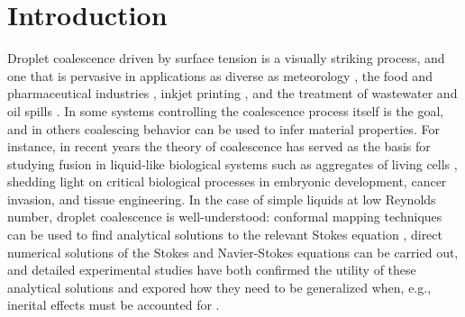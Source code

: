 \documentclass[%
reprint,
amsmath,amssymb,
aps,
]{revtex4-2}
\begin{document}
	\maketitle
	
	
	\section{Introduction}
	Droplet coalescence driven by surface tension is a visually striking process, and one that is pervasive in applications as diverse as  meteorology \cite{grabowski2013growth}, the food \cite{tan2021application} and pharmaceutical industries \cite{barkat2011basics},  inkjet printing \cite{sun2015recent}, and the treatment of wastewater \cite{hussein2019application} and oil spills \cite{zhu2022recent}. In some systems controlling the coalescence process itself is the goal, and in others coalescing behavior can be used to infer material properties. For instance, in recent years the theory of coalescence has served as the basis for studying fusion in liquid-like biological systems such as aggregates of living cells  \cite{grosserCellNucleusShape2021a,koshelevaCellSpheroidFusion2020a, oriola2022arrested}, shedding light on critical biological processes in embryonic development, cancer invasion, and tissue engineering. In the case of simple liquids at low Reynolds number, droplet coalescence is well-understood: conformal mapping techniques can be used to find analytical solutions to the relevant Stokes equation \cite{hopperCoalescenceTwoViscous1993,hopperCoalescenceTwoViscous1993a}, direct numerical solutions of the Stokes and Navier-Stokes equations can be carried out, and detailed experimental studies have both confirmed the utility of these analytical solutions and expored how they need to be generalized when, e.g., inerital effects must be accounted for \cite{shuravin2019coalescence, paulsen2013pre,paulsenCoalescenceBubblesDrops2014,paulsenInexorableResistanceInertia2012a}.
\end{document}
